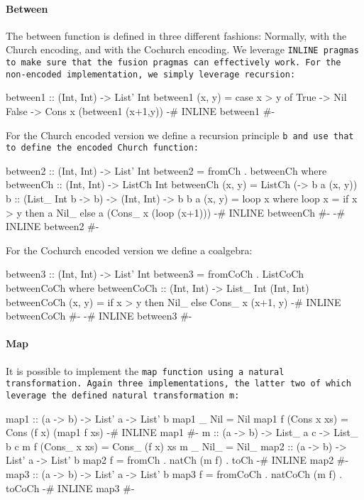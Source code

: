 \paragraph{Between}
The between function is defined in three different fashions: Normally, with the Church encoding, and with the Cochurch encoding.
We leverage \tt{INLINE} pragmas to make sure that the fusion pragmas can effectively work.
For the non-encoded implementation, we simply leverage recursion:
\begin{code}
between1 :: (Int, Int) -> List' Int
between1 (x, y) = case x > y of
  True  -> Nil
  False -> Cons x (between1 (x+1,y))
{-# INLINE between1 #-}
\end{code}
For the Church encoded version we define a recursion principle \tt{b} and use that to define the encoded Church function:
\begin{code}
between2 :: (Int, Int) -> List' Int
between2 = fromCh . betweenCh
  where betweenCh :: (Int, Int) -> ListCh Int
        betweenCh (x, y) = ListCh (\a -> b a (x, y))
        b :: (List_ Int b -> b) -> (Int, Int) -> b
        b a (x, y) = loop x
          where loop x = if x > y
                         then a Nil_
                         else a (Cons_ x (loop (x+1)))
        {-# INLINE betweenCh #-}
{-# INLINE between2 #-}
\end{code}
For the Cochurch encoded version we define a coalgebra:
\begin{code}
between3 :: (Int, Int) -> List' Int
between3 = fromCoCh . ListCoCh betweenCoCh
  where betweenCoCh :: (Int, Int) -> List_ Int (Int, Int)
        betweenCoCh (x, y) = if x > y 
                             then Nil_
                             else Cons_ x (x+1, y)
        {-# INLINE betweenCoCh #-}
{-# INLINE between3 #-}
\end{code}

\paragraph{Map}
It is possible to implement the \tt{map} function using a natural transformation. Again three implementations, the latter two of which leverage the defined natural transformation \tt{m}:
\begin{code}
map1 :: (a -> b) -> List' a -> List' b
map1 _ Nil = Nil
map1 f (Cons x xs) = Cons (f x) (map1 f xs)
{-# INLINE map1 #-}
m :: (a -> b) -> List_ a c -> List_ b c
m f (Cons_ x xs) = Cons_ (f x) xs
m _ Nil_ = Nil_
map2 :: (a -> b) -> List' a -> List' b
map2 f = fromCh . natCh (m f) . toCh
{-# INLINE map2 #-}
map3 :: (a -> b) -> List' a -> List' b
map3 f = fromCoCh . natCoCh (m f) . toCoCh
{-# INLINE map3 #-}
\end{code}
